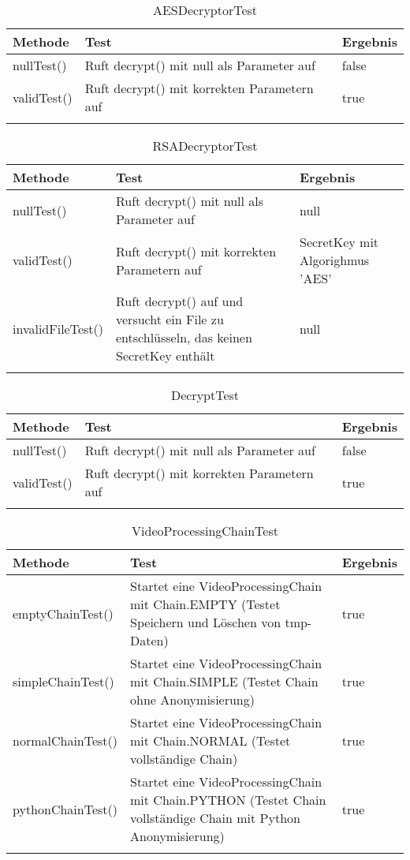  \begin{longtable}{p{} | p{} | p{}}
\hline
   \textbf{Methode} & \textbf{Test} & \textbf{Ergebnis}\\
  \hline
  nullTest() & Ruft decrypt() mit null als Parameter auf & false\\
  \hline
  validTest() & Ruft decrypt() mit korrekten Parametern auf & true\\
  \hline 
  \caption{AESDecryptorTest}
 \end{longtable}
 
 \begin{longtable}{p{} | p{} | p{}}
 \hline
 \textbf{Methode} & \textbf{Test} & \textbf{Ergebnis}\\
  \hline
  nullTest() & Ruft decrypt() mit null als Parameter auf & null\\
  \hline
  validTest() & Ruft decrypt() mit korrekten Parametern auf & SecretKey mit Algorighmus 'AES'\\
  \hline 
  invalidFileTest() & Ruft decrypt() auf und versucht ein File zu entschlüsseln, das keinen SecretKey enthält & null\\
  \hline
  \caption{RSADecryptorTest}
 \end{longtable}
 
 \begin{longtable}{p{} | p{} | p{}}
\hline
   \textbf{Methode} & \textbf{Test} & \textbf{Ergebnis}\\
  \hline
  nullTest() & Ruft decrypt() mit null als Parameter auf & false\\
  \hline
  validTest() & Ruft decrypt() mit korrekten Parametern auf & true\\
  \hline 
  \caption{DecryptTest}
 \end{longtable}
 
 \begin{longtable}{p{} | p{} | p{}}
\hline
  \textbf{Methode} & \textbf{Test} & \textbf{Ergebnis}\\
  \hline
  emptyChainTest() & Startet eine VideoProcessingChain mit Chain.EMPTY (Testet Speichern und Löschen von tmp-Daten) & true\\
  \hline
  simpleChainTest() & Startet eine VideoProcessingChain mit Chain.SIMPLE (Testet Chain ohne Anonymisierung) & true\\
  \hline
  normalChainTest() & Startet eine VideoProcessingChain mit Chain.NORMAL (Testet vollständige Chain) & true\\
  \hline
  pythonChainTest() & Startet eine VideoProcessingChain mit Chain.PYTHON (Testet Chain vollständige Chain mit Python Anonymisierung) & true\\
  \hline
  \caption{VideoProcessingChainTest}
 \end{longtable}
 
